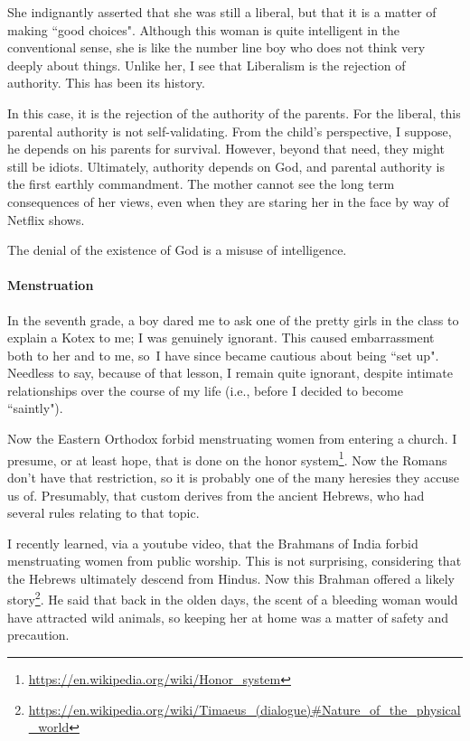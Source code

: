 She indignantly asserted that she was still a liberal, but that it is a matter of making ``good choices". Although this woman is quite intelligent in the conventional sense, she is like the number line boy who does not think very deeply about things. Unlike her, I see that Liberalism is the rejection of authority. This has been its history.

In this case, it is the rejection of the authority of the parents. For the liberal, this parental authority is not self-validating. From the child's perspective, I suppose, he depends on his parents for survival. However, beyond that need, they might still be idiots. Ultimately, authority depends on God, and parental authority is the first earthly commandment. The mother cannot see the long term consequences of her views, even when they are staring her in the face by way of Netflix shows.

The denial of the existence of God is a misuse of intelligence.

\paragraph{Menstruation}
In the seventh grade, a boy dared me to ask one of the pretty girls in the class to explain a Kotex to me; I was genuinely ignorant. This caused embarrassment both to her and to me, so I have since became cautious about being ``set up". Needless to say, because of that lesson, I remain quite ignorant, despite intimate relationships over the course of my life (i.e., before I decided to become ``saintly").

Now the Eastern Orthodox forbid menstruating women from entering a church. I presume, or at least hope, that is done on the honor system\footnote{\url{https://en.wikipedia.org/wiki/Honor_system}}. Now the Romans don't have that restriction, so it is probably one of the many heresies they accuse us of. Presumably, that custom derives from the ancient Hebrews, who had several rules relating to that topic.

I recently learned, via a youtube video, that the Brahmans of India forbid menstruating women from public worship. This is not surprising, considering that the Hebrews ultimately descend from Hindus. Now this Brahman offered a likely story\footnote{\url{https://en.wikipedia.org/wiki/Timaeus_(dialogue)\#Nature_of_the_physical_world}}. He said that back in the olden days, the scent of a bleeding woman would have attracted wild animals, so keeping her at home was a matter of safety and precaution.

